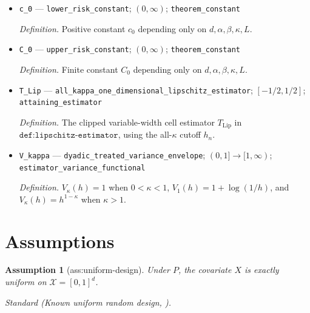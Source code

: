 \documentclass{article}
\newtheorem{assumption}{Assumption}
\begin{document}
\begin{itemize}
  \par\smallskip\noindent\emph{Definition.} DERIVED by \(\texttt{oeq:full-frontier}\) from the handle \(\mathfrak H_{\mathrm{rob}}\): a total finite Borel estimator \(T^\star_n\) with explicit tuning, zero-count fallbacks, arithmetic complexity, and memory complexity.
  \item \texttt{c\_\allowbreak{}0} --- \texttt{lower\_\allowbreak{}risk\_\allowbreak{}constant}; \((0,\infty)\); \texttt{theorem\_\allowbreak{}constant}
  \par\smallskip\noindent\emph{Definition.} Positive constant \(c_0\) depending only on \(d,\alpha,\beta,\kappa,L\).
  \item \texttt{C\_\allowbreak{}0} --- \texttt{upper\_\allowbreak{}risk\_\allowbreak{}constant}; \((0,\infty)\); \texttt{theorem\_\allowbreak{}constant}
  \par\smallskip\noindent\emph{Definition.} Finite constant \(C_0\) depending only on \(d,\alpha,\beta,\kappa,L\).
  \item \texttt{T\_\allowbreak{}Lip} --- \texttt{all\_\allowbreak{}kappa\_\allowbreak{}one\_\allowbreak{}dimensional\_\allowbreak{}lipschitz\_\allowbreak{}estimator}; \([-1/2,1/2]\); \texttt{attaining\_\allowbreak{}estimator}
  \par\smallskip\noindent\emph{Definition.} The clipped variable-width cell estimator \(T_{\mathrm{Lip}}\) in \(\texttt{def:lipschitz-estimator}\), using the all-\(\kappa\) cutoff \(h_n\).
  \item \texttt{V\_\allowbreak{}kappa} --- \texttt{dyadic\_\allowbreak{}treated\_\allowbreak{}variance\_\allowbreak{}envelope}; \((0,1]\to[1,\infty)\); \texttt{estimator\_\allowbreak{}variance\_\allowbreak{}functional}
  \par\smallskip\noindent\emph{Definition.} \(V_\kappa(h)=1\) when \(0<\kappa<1\), \(V_1(h)=1+\log(1/h)\), and \(V_\kappa(h)=h^{1-\kappa}\) when \(\kappa>1\).
\end{itemize}

\section{Assumptions}

\begin{assumption}[ass:uniform-design]\label{ass:uniform-design}
Under \(P\), the covariate \(X\) is exactly uniform on \(\mathcal X=[0,1]^d\).
\par\smallskip\noindent\emph{Standard} (Known uniform random design, \cite{Stone1982}).
\end{assumption}
\end{document}
